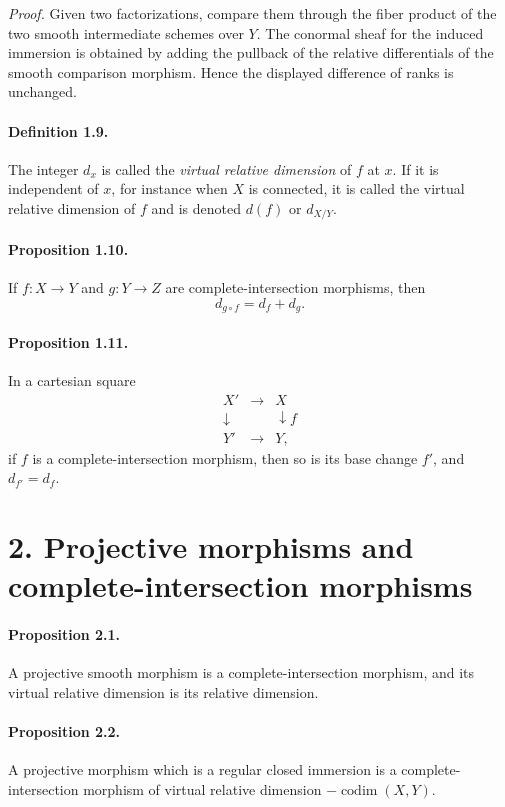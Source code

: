 \documentclass[12pt]{article}
\newcommand{\codim}{\operatorname{codim}}
\begin{document}
\emph{Proof.} Given two factorizations, compare them through the fiber product of the two smooth intermediate schemes over $Y$. The conormal sheaf for the induced immersion is obtained by adding the pullback of the relative differentials of the smooth comparison morphism. Hence the displayed difference of ranks is unchanged.

\paragraph{Definition 1.9.} The integer $d_x$ is called the \emph{virtual relative dimension} of $f$ at $x$. If it is independent of $x$, for instance when $X$ is connected, it is called the virtual relative dimension of $f$ and is denoted $d(f)$ or $d_{X/Y}$.

\paragraph{Proposition 1.10.} If $f:X\to Y$ and $g:Y\to Z$ are complete-intersection morphisms, then
\[
d_{g\circ f}=d_f+d_g.
\]

\paragraph{Proposition 1.11.} In a cartesian square
\[
\begin{array}{ccc}
X'&\longrightarrow&X\\
\downarrow&&\downarrow f\\
Y'&\longrightarrow&Y,
\end{array}
\]
if $f$ is a complete-intersection morphism, then so is its base change $f'$, and $d_{f'}=d_f$.

\section*{2. Projective morphisms and complete-intersection morphisms}

\paragraph{Proposition 2.1.} A projective smooth morphism is a complete-intersection morphism, and its virtual relative dimension is its relative dimension.

\paragraph{Proposition 2.2.} A projective morphism which is a regular closed immersion is a complete-intersection morphism of virtual relative dimension $-\codim(X,Y)$.
\end{document}
